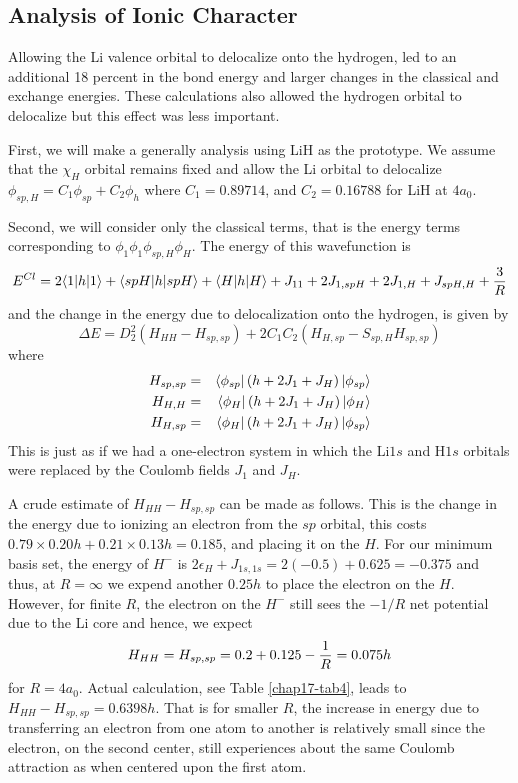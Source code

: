 \subsection{Analysis of Ionic Character}

Allowing the Li valence orbital to delocalize onto the hydrogen, led to
an additional 18 percent in the bond energy and larger changes in the 
classical and exchange energies.  These calculations also allowed the 
hydrogen orbital to delocalize but this effect was less important.

First, we will make a generally analysis using LiH as the prototype.
We assume that the $\chi_H$ orbital remains fixed and allow the Li orbital to
delocalize $\phi_{sp,H} = C_1 \phi_{sp} + C_2 \phi_h$ 
where $C_1 = 0.89714$, and $C_2 = 0.16788$ for LiH at $4a_0$.

Second, we will consider only the classical terms, that is the energy terms
corresponding to $\phi_1 \phi_1 \phi_{sp,H} \phi_H$. The energy of this 
wavefunction is
\begin{equation}
E^{Cl} = 2 \langle 1 | h | 1 \rangle + \langle spH | h | spH 
\rangle + \langle H | h | H \rangle + J_{11} + 2J_{1,spH} + 2J_{1,H} + 
J_{spH,H} + {3 \over R}
\end{equation}
and the change in the energy due to delocalization onto the hydrogen, is
given by
\begin{equation}
\Delta E = D^2_2 \left( H_{HH} - H_{sp,sp} \right) + 2 C_1C_2 \left( 
H_{H,sp} - S_{sp,H} H_{sp,sp} \right)
\label{chap17-eqno11}
\end{equation}
where
\begin{eqnarray}
H_{sp,sp} &=& \langle \phi_{sp} | \left( h + 2J_1 + J_H \right) | 
\phi_{sp} \rangle\cr
H_{H,H} &=& \langle \phi_H | \left( h + 2J_1 + J_H \right) | 
\phi_H \rangle\cr
H_{H,sp} &=& \langle \phi_H | \left( h + 2J_1 + J_H \right) | 
\phi_{sp} \rangle
\end{eqnarray}
This is just as if we had a one-electron system in which the Li$1s$ and 
H$1s$ orbitals were replaced by the Coulomb fields $J_1$ and $J_H$.

A crude estimate of $H_{HH} - H_{sp,sp}$ can be made as follows.  This is the
change in the energy due to ionizing an electron from the $sp$ orbital, this
costs $0.79 \times 0.20h + 0.21 \times 0.13h = 0.185$, and placing it on 
the $H$.  For our minimum basis set, the energy of $H^-$ is
$2 \epsilon_H + J_{1s,1s} = 2 (-0.5) + 0.625 = -0.375$
and thus, at $R = \infty$ we expend another $0.25h$ to place the electron on the
$H$.  However, for finite $R$, the electron on the $H^-$ still sees the 
$-1/R$ net potential due to the Li core and hence, we expect
\begin{equation}
H_{HH} = H_{sp,sp} = 0.2 + 0.125 - {1 \over R} = 0.075h
\end{equation}
for $R = 4a_0$.  Actual calculation, see Table \ref{chap17-tab4},
leads to $H_{HH} - H_{sp,sp} = 0.6398h$.  That is for smaller $R$, the
increase in energy due to transferring an electron from one atom to
another is relatively small since the electron, on the second center,
still experiences about the same Coulomb attraction as when centered
upon the first atom.

